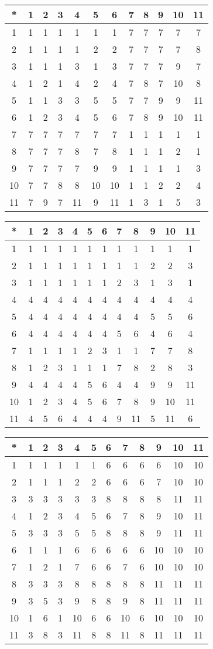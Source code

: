 \begin{tabular}[t]{c|ccccccccccc}
*&1&2&3&4&5&6&7&8&9&10&11 \\ \hline
    1&1&1&1&1&1&1&7&7&7&7&7 \\
    2&1&1&1&1&2&2&7&7&7&7&8 \\
    3&1&1&1&3&1&3&7&7&7&9&7 \\
    4&1&2&1&4&2&4&7&8&7&10&8 \\
    5&1&1&3&3&5&5&7&7&9&9&11 \\
    6&1&2&3&4&5&6&7&8&9&10&11 \\
    7&7&7&7&7&7&7&1&1&1&1&1 \\
    8&7&7&7&8&7&8&1&1&1&2&1 \\
    9&7&7&7&7&9&9&1&1&1&1&3 \\
    10&7&7&8&8&10&10&1&1&2&2&4 \\
    11&7&9&7&11&9&11&1&3&1&5&3 
\end{tabular}


\begin{tabular}[t]{c|ccccccccccc}
*&1&2&3&4&5&6&7&8&9&10&11 \\ \hline
    1&1&1&1&1&1&1&1&1&1&1&1 \\
    2&1&1&1&1&1&1&1&1&2&2&3 \\
    3&1&1&1&1&1&1&2&3&1&3&1 \\
    4&4&4&4&4&4&4&4&4&4&4&4 \\
    5&4&4&4&4&4&4&4&4&5&5&6 \\
    6&4&4&4&4&4&4&5&6&4&6&4 \\
    7&1&1&1&1&2&3&1&1&7&7&8 \\
    8&1&2&3&1&1&1&7&8&2&8&3 \\
    9&4&4&4&4&5&6&4&4&9&9&11 \\
    10&1&2&3&4&5&6&7&8&9&10&11 \\
    11&4&5&6&4&4&4&9&11&5&11&6 
\end{tabular}


\begin{tabular}[t]{c|ccccccccccc}
*&1&2&3&4&5&6&7&8&9&10&11 \\ \hline
    1&1&1&1&1&1&6&6&6&6&10&10 \\
    2&1&1&1&2&2&6&6&6&7&10&10 \\
    3&3&3&3&3&3&8&8&8&8&11&11 \\
    4&1&2&3&4&5&6&7&8&9&10&11 \\
    5&3&3&3&5&5&8&8&8&9&11&11 \\
    6&1&1&1&6&6&6&6&6&10&10&10 \\
    7&1&2&1&7&6&6&7&6&10&10&10 \\
    8&3&3&3&8&8&8&8&8&11&11&11 \\
    9&3&5&3&9&8&8&9&8&11&11&11 \\
    10&1&6&1&10&6&6&10&6&10&10&10 \\
    11&3&8&3&11&8&8&11&8&11&11&11 
\end{tabular}


